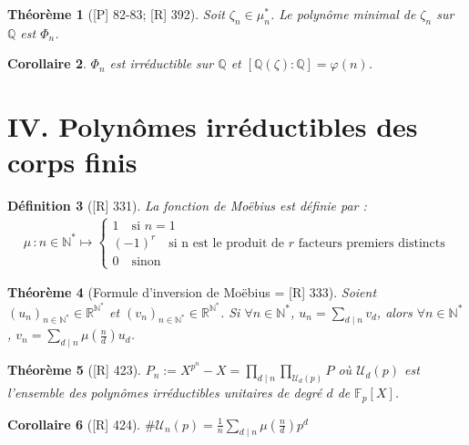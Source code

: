 \documentclass[10pt, a4paper, parskip=full, twoside, twocolumn]{report}
\newtheorem{definition}{Définition}
\newtheorem{theorem}[definition]{Théorème}
\newtheorem{corollary}[definition]{Corollaire}
\newcommand{\IN}{\mathbb{N}}
\newcommand{\IQ}{\mathbb{Q}}
\newcommand{\IF}{\mathbb{F}}
\newcommand{\IR}{\mathbb{R}}
\begin{document}
\begin{tcolorbox}[
    breakable, %
    colback=developpement, %
    colframe=gray!0!black, %
    boxrule=0pt, %
    arc=1mm, %
	boxsep=0pt,
	left=0pt, right=0pt, top=0pt, bottom=0pt
]
\begin{theorem}[\textnormal{[P] 82-83; [R] 392}]
	\label{141dev1b1}
	Soit $\zeta_n\in\mu_n^*$. Le polynôme minimal de $\zeta_n$ sur $\IQ$ est $\Phi_n$.
\end{theorem}

\begin{corollary}
	\label{141dev1b2}
	$\Phi_n$ est irréductible sur $\IQ$ et $[\IQ(\zeta) : \IQ] = \varphi(n)$.
\end{corollary}
\end{tcolorbox}

\section*{IV. Polynômes irréductibles des corps finis}

\begin{definition}[\textnormal{[R] 331}]
	La \emph{fonction de Moëbius} est définie par :
	\begin{align*}
		\mu\,\colon n\in\IN^* \mapsto \begin{cases}
			1\quad \text{si } n =1 \\
			(-1)^r\quad \text{si n est le produit de $r$ facteurs premiers distincts} \\
			0\quad\text{sinon}
		\end{cases}
	\end{align*}
\end{definition}


\begin{tcolorbox}[
    breakable, %
    colback=developpement, %
    colframe=gray!0!black, %
    boxrule=0pt, %
    arc=1mm, %
	boxsep=0pt,
	left=0pt, right=0pt, top=0pt, bottom=0pt
]
\begin{theorem}[Formule d'inversion de Moëbius = \textnormal{[R] 333}]
	\label{141dev21}
	Soient $\left(u_n\right)_{n\in\IN^*}\in\IR^{\IN^*}$ et $\left(v_n\right)_{n\in\IN^*}\in\IR^{\IN^*}$.
	Si $\forall n\in\IN^*$, $u_n = \sum_{d\mid n} v_d$, alors $\forall n\in\IN^*$, $v_n = \sum_{d\mid n}\mu(\frac{n}{d})u_d$.
\end{theorem}
\begin{theorem}[\textnormal{[R] 423}]
	\label{141dev22}
	$P_n := X^{p^n}-X =\prod_{d\mid n}\prod_{\mathcal{U}_d(p)} P$ où $\mathcal{U}_d(p)$ est l'ensemble des 
	polynômes irréductibles unitaires de degré $d$ de $\IF_p[X]$.
\end{theorem}
\begin{corollary}[\textnormal{[R] 424}]
	\label{141dev23}
	$\#\mathcal{U}_n(p) = \frac{1}{n}\sum_{d\mid n}\mu(\frac{n}{d})p^d$
\end{corollary}
\end{tcolorbox}
\end{document}
